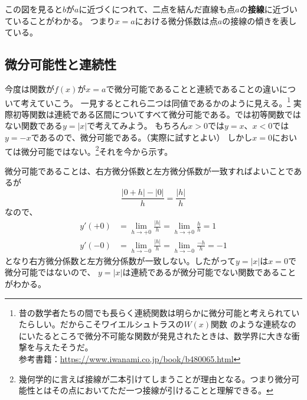 \documentclass[a4j,dvipdfmx]{jsarticle}
\begin{document}
            この図を見ると$b$が$a$に近づくにつれて、二点を結んだ直線も点$a$の\textbf{接線}に近づいていることがわかる。
            つまり$x=a$における微分係数は点$a$の接線の傾きを表している。
        \clearpage
        \subsection{微分可能性と連続性}
            今度は関数が$f(x)$が$x=a$で微分可能であることと連続であることの違いについて考えていこう。
            一見するとこれら二つは同値であるかのように見える。\footnote{昔の数学者たちの間でも長らく連続関数は明らかに微分可能と考えられていたらしい。だからこそワイエルシュトラスの$W(x)$関数
            のような連続なのにいたるところで微分不可能な関数が発見されたときは、数学界に大きな衝撃を与えたそうだ。\\参考書籍：\url{https://www.iwanami.co.jp/book/b480065.html}}
            実際初等関数は連続である区間についてすべて微分可能である。では初等関数ではない関数である$y=|x|$で考えてみよう。
            もちろん$x>0$では$y=x$、$x<0$では$y=-x$であるので、微分可能である。（実際に試すとよい）
            しかし$x=0$においては微分可能ではない。\footnote{幾何学的に言えば接線が二本引けてしまうことが理由となる。つまり微分可能性とはその点においてただ一つ接線が引けることと理解できる。\label{微分可能性の幾何学的意味}}それを今から示す。

            微分可能であることは、右方微分係数と左方微分係数が一致すればよいことであるが
            \begin{equation}
                \frac{|0+h|-|0|}{h}=\frac{|h|}{h}
            \end{equation}
            なので、
            \begin{align}
                y'(+0)&=\lim_{h\to +0}\frac{|h|}{h}=\lim_{h\to+0}\frac{h}{h}=1\\
                y'(-0)&=\lim_{h\to -0}\frac{|h|}{h}=\lim_{h\to -0}\frac{-h}{h}=-1
            \end{align}
            となり右方微分係数と左方微分係数が一致しない。したがって$y=|x|$は$x=0$で微分可能ではないので、
            $y=|x|$は連続であるが微分可能でない関数であることがわかる。
\end{document}
